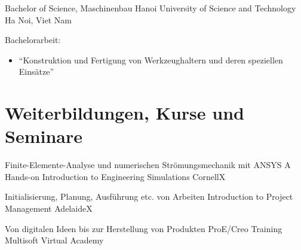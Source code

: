 \documentclass[11pt,a4paper,sans]{moderncv}
\begin{document}
{Bachelor of Science, Maschinenbau}
{Hanoi University of Science and Technology}
{Ha Noi, Viet Nam}
{}
{
    Bachelorarbeit:
    \begin{itemize}
        \item "`Konstruktion und Fertigung von Werkzeughaltern und deren speziellen Einsätze"'
    \end{itemize}
}


\section{\textbf{Weiterbildungen, Kurse und Seminare}}

{Finite-Elemente-Analyse und numerischen Strömungsmechanik mit ANSYS}
{A Hands-on Introduction to Engineering Simulations}
{CornellX}
{}
{}

{Initialisierung, Planung, Ausführung etc. von Arbeiten}
{Introduction to Project Management}
{AdelaideX}
{}
{}

{Von digitalen Ideen bis zur Herstellung von Produkten}
{ProE/Creo Training}
{Multisoft Virtual Academy}
{}
{}



\end{document}
